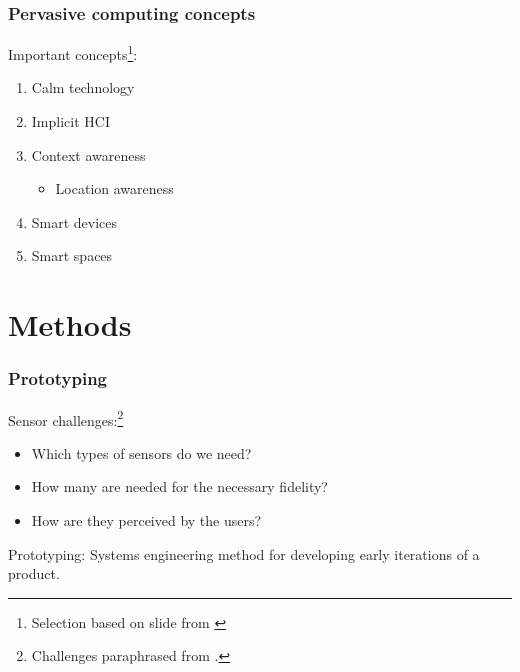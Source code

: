 \documentclass[10pt]{beamer}
\begin{document}
\begin{frame}
  \frametitle{Pervasive computing concepts}
  Important concepts\footnote{Selection based on slide from \cite{wagnerPervasiveComputing2022}}:
  \begin{enumerate}
    \item Calm technology
    \item Implicit HCI
    \item Context awareness
    \begin{itemize}
      \item Location awareness
    \end{itemize}
    \item Smart devices
    \item Smart spaces
  \end{enumerate}

\end{frame}

\section{Methods}

\begin{frame}
  \frametitle{Prototyping}
  Sensor challenges:\footnote{Challenges paraphrased from \cite{wagnerContextAwareness2022}.}
  \begin{itemize}
    \item Which types of sensors do we need?
    \item How many are needed for the necessary fidelity?
    \item \alert{How are they perceived by the users?}
  \end{itemize}

  Prototyping: Systems engineering method for developing early iterations of a product.
\end{frame}
\end{document}
